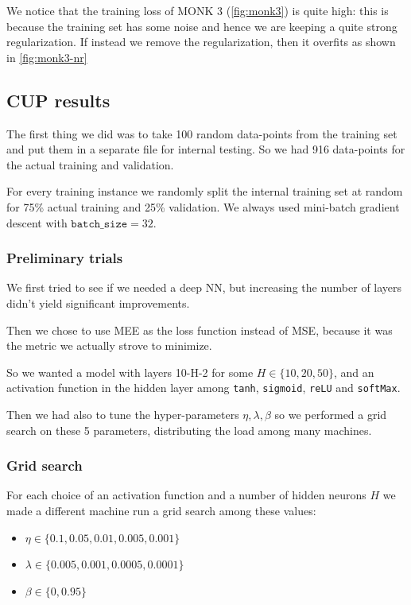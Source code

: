 We notice that the training loss of MONK 3 (\cref{fig:monk3}) is quite high: this is because the training set has some noise and hence we are keeping a quite strong regularization.
If instead we remove the regularization, then it overfits as shown in \cref{fig:monk3-nr}

\clearpage

\subsection{CUP results}

The first thing we did was to take 100 random data-points from the training set and put them in a separate file for internal testing. So we had 916 data-points for the actual training and validation.

For every training instance we randomly split the internal training set at random for 75\% actual training and 25\% validation. We always used mini-batch gradient descent with $\texttt{batch\_size}=32$.


\subsubsection{Preliminary trials}

We first tried to see if we needed a deep NN, but increasing the number of layers didn't yield significant improvements.

Then we chose to use MEE as the loss function instead of MSE, because it was the metric we actually strove to minimize.

So we wanted a model with layers 10-H-2 for some $H\in\{ 10, 20, 50 \}$, and an activation function in the hidden layer among \texttt{tanh}, \texttt{sigmoid}, \texttt{reLU} and \texttt{softMax}.

Then we had also to tune the hyper-parameters $\eta,\lambda,\beta$ so we performed a grid search on these 5 parameters, distributing the load among many machines.

\subsubsection{Grid search}

For each choice of an activation function and a number of hidden neurons $H$ we made a different machine run a grid search among these values:
\begin{itemize}
    \item $\eta\in\{ 0.1, 0.05, 0.01, 0.005, 0.001 \}$
    \item $\lambda\in\{ 0.005, 0.001, 0.0005, 0.0001 \}$
    \item $\beta\in\{ 0, 0.95 \}$
\end{itemize}

